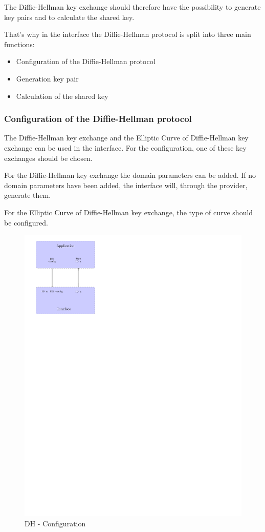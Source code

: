The Diffie-Hellman key exchange should therefore have the possibility to
generate key pairs and to calculate the shared key.

That's why in the interface the Diffie-Hellman protocol is split into three main
functions:
\begin{itemize}[noitemsep]
  \item Configuration of the Diffie-Hellman protocol
  \item Generation key pair
  \item Calculation of the shared key
\end{itemize}


\subsubsection*{Configuration of the Diffie-Hellman protocol}
The Diffie-Hellman key exchange and the Elliptic Curve of Diffie-Hellman key
exchange can be used in the interface.
For the configuration, one of these key exchanges should be chosen.

For the Diffie-Hellman key exchange the domain parameters can be added. If no
domain parameters have been added, the interface will, through the provider,
generate them.

For the Elliptic Curve of Diffie-Hellman key exchange, the type of curve should
be configured.

\begin{figure}[!ht]
\centering
\includegraphics[trim=0cm 20cm 10cm 0cm]{figures/gci_dh_config.pdf}
\caption{DH - Configuration\newline}
\label{fig:gci_dh_config}
\end{figure}

